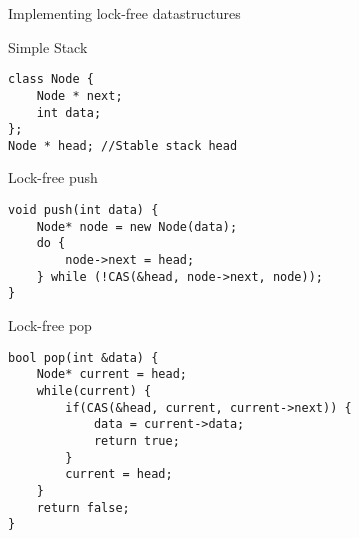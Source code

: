 \begin{frame}{Implementing lock-free datastructures}
\begin{block}{Simple Stack}
\begin{lstlisting}[style=customc]
class Node {
    Node * next;
    int data;
};
Node * head; //Stable stack head
\end{lstlisting}
\end{block} 

\begin{block}{Lock-free push}
\begin{lstlisting}[style=customc]
void push(int data) {
    Node* node = new Node(data);
    do {
        node->next = head;
    } while (!CAS(&head, node->next, node));
}
\end{lstlisting}
\end{block}

\begin{block}{Lock-free pop}
\begin{lstlisting}[style=customc]
bool pop(int &data) {
    Node* current = head;
    while(current) {
        if(CAS(&head, current, current->next)) {
            data = current->data;
            return true;
        }
        current = head;
    }
    return false;
}
\end{lstlisting}
\end{block}

\end{frame}

